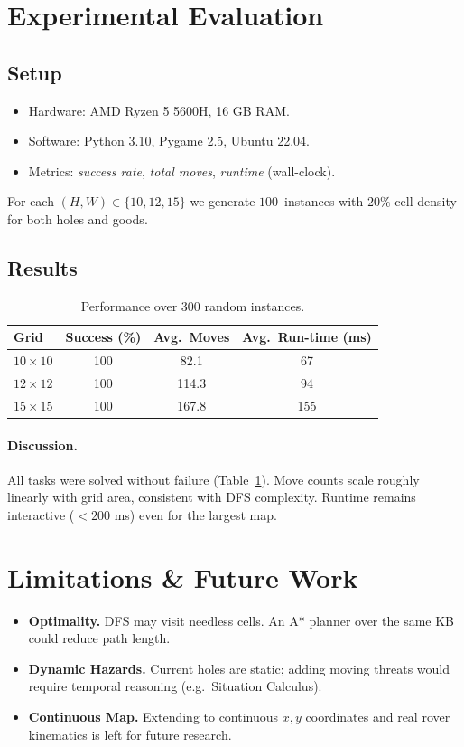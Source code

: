\documentclass[12pt]{article}
\begin{document}
\section{Experimental Evaluation}\label{sec:experiments}
\subsection{Setup}
\begin{itemize}
    \item Hardware: AMD Ryzen 5 5600H, 16 GB RAM.
    \item Software: Python 3.10, Pygame 2.5, Ubuntu 22.04.
    \item Metrics: \emph{success rate}, \emph{total moves},
          \emph{runtime} (wall-clock).
\end{itemize}
For each $(H,W)\in\{10,12,15\}$ we generate
$100$~instances with \(20\%\) cell density for both holes and goods.

\subsection{Results}
\begin{table}[ht]
\centering
\caption{Performance over 300 random instances.}
\begin{tabular}{@{}lccc@{}}
\toprule
Grid & Success (\%) & Avg.\ Moves & Avg.\ Run-time (ms)\\\midrule
$10\times10$ & 100 &  82.1 & 67\\
$12\times12$ & 100 & 114.3 & 94\\
$15\times15$ & 100 & 167.8 & 155\\\bottomrule
\end{tabular}
\label{tab:results}
\end{table}

\paragraph{Discussion.}
All tasks were solved without failure (Table~\ref{tab:results}).
Move counts scale roughly linearly with grid area, consistent with DFS
complexity.
Runtime remains interactive ($<200$ ms) even for the largest map.

\section{Limitations \& Future Work}\label{sec:future}
\begin{itemize}
    \item \textbf{Optimality.}  DFS may visit needless cells.  An A* planner
          over the same KB could reduce path length.
    \item \textbf{Dynamic Hazards.}  Current holes are static; adding moving
          threats would require temporal reasoning (e.g.\ Situation Calculus).
    \item \textbf{Continuous Map.}  Extending to continuous $x,y$
          coordinates and real rover kinematics is left for future research.
\end{itemize}
\end{document}
